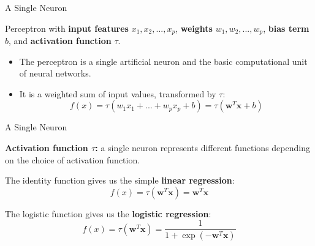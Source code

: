 \documentclass[11pt,compress,t,notes=noshow, xcolor=table]{beamer}
\begin{document}
\begin{vbframe} {A Single Neuron}
\vspace{-0.6cm}
\begin{figure}
\centering
{}
\end{figure}
\vspace{-1.8cm}
\footnotesize Perceptron %
with \textbf{input features} $x_1, x_2, ... ,x_p$, \textbf{weights} $w_1, w_2,... ,w_p$, \textbf{bias term} $b$, and \textbf{activation function} $\tau$.
\vspace{.2cm}
\normalsize
\begin{itemize}
\item The perceptron is a single artificial neuron and the basic computational unit of neural networks.
\vspace{.2cm}
\item It is a weighted sum of input values, transformed by $\tau$:
\vspace{-1mm}
$$f(x) = \tau(w_1x_1 + ... + w_px_p +  b) = \tau(\mathbf{w}^T \mathbf{x}+b)$$
\end{itemize}
\end{vbframe}

\begin{framei}{A Single Neuron}
\item \textbf{Activation function $\tau$:} a single neuron %
 represents different functions %
 depending on the choice of activation function.
\item The identity function gives us the simple \textbf{linear regression}:
$$f(x) = \tau(\mathbf{w}^T \mathbf{x}) = \mathbf{w}^T \mathbf{x}$$
\item The logistic function gives us the \textbf{logistic regression}:
$$f(x) = \tau(\mathbf{w}^T \mathbf{x}) = \frac{1}{1 + \exp(-\mathbf{w}^T \mathbf{x})}$$
\end{framei}
\end{document}
